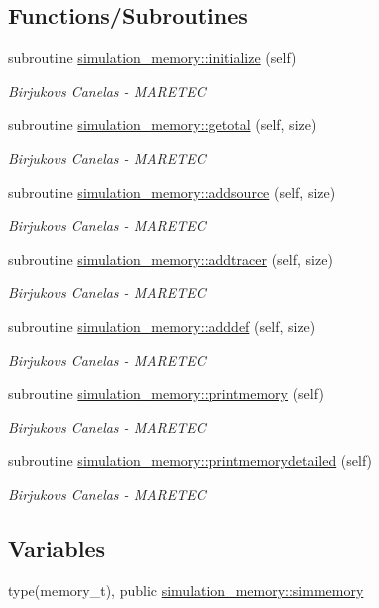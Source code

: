 \subsection*{Functions/\+Subroutines}
\begin{DoxyCompactItemize}
\item 
subroutine \mbox{\hyperlink{namespacesimulation__memory_a3b8f4e0766c90e6d6bd99e2fa49ea91b}{simulation\+\_\+memory\+::initialize}} (self)
\begin{DoxyCompactList}\small\item\em Birjukovs Canelas -\/ M\+A\+R\+E\+T\+EC \end{DoxyCompactList}\item 
subroutine \mbox{\hyperlink{namespacesimulation__memory_a8589522c4e28cf60741a5439477cdb31}{simulation\+\_\+memory\+::getotal}} (self, size)
\begin{DoxyCompactList}\small\item\em Birjukovs Canelas -\/ M\+A\+R\+E\+T\+EC \end{DoxyCompactList}\item 
subroutine \mbox{\hyperlink{namespacesimulation__memory_acf01ce7bcb2d7571d37fb2c0338e5bd2}{simulation\+\_\+memory\+::addsource}} (self, size)
\begin{DoxyCompactList}\small\item\em Birjukovs Canelas -\/ M\+A\+R\+E\+T\+EC \end{DoxyCompactList}\item 
subroutine \mbox{\hyperlink{namespacesimulation__memory_a4d6c8bd027a99cb6c7f9ad2eb55c744f}{simulation\+\_\+memory\+::addtracer}} (self, size)
\begin{DoxyCompactList}\small\item\em Birjukovs Canelas -\/ M\+A\+R\+E\+T\+EC \end{DoxyCompactList}\item 
subroutine \mbox{\hyperlink{namespacesimulation__memory_a62d5641dbec45bc279575c173b0f0f24}{simulation\+\_\+memory\+::adddef}} (self, size)
\begin{DoxyCompactList}\small\item\em Birjukovs Canelas -\/ M\+A\+R\+E\+T\+EC \end{DoxyCompactList}\item 
subroutine \mbox{\hyperlink{namespacesimulation__memory_a5827bef8479b809a453af147ceaa8c7c}{simulation\+\_\+memory\+::printmemory}} (self)
\begin{DoxyCompactList}\small\item\em Birjukovs Canelas -\/ M\+A\+R\+E\+T\+EC \end{DoxyCompactList}\item 
subroutine \mbox{\hyperlink{namespacesimulation__memory_af2a472000acc1ff59cb6e63679617699}{simulation\+\_\+memory\+::printmemorydetailed}} (self)
\begin{DoxyCompactList}\small\item\em Birjukovs Canelas -\/ M\+A\+R\+E\+T\+EC \end{DoxyCompactList}\end{DoxyCompactItemize}
\subsection*{Variables}
\begin{DoxyCompactItemize}
\item 
type(memory\+\_\+t), public \mbox{\hyperlink{namespacesimulation__memory_a8ed2bc20b0c49405084442d02fc76d42}{simulation\+\_\+memory\+::simmemory}}
\end{DoxyCompactItemize}
